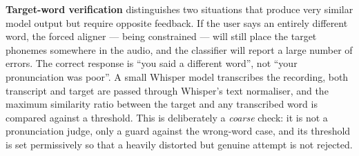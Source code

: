 \textbf{Target-word verification} distinguishes two situations that produce very
similar model output but require opposite feedback. If the user says an entirely
different word, the forced aligner --- being constrained --- will still place
the target phonemes somewhere in the audio, and the classifier will report a
large number of errors. The correct response is ``you said a different word'',
not ``your pronunciation was poor''. A small Whisper model transcribes the
recording, both transcript and target are passed through Whisper's text
normaliser, and the maximum similarity ratio between the target and any
transcribed word is compared against a threshold. This is deliberately a
\emph{coarse} check: it is not a pronunciation judge, only a guard against the
wrong-word case, and its threshold is set permissively so that a heavily
distorted but genuine attempt is not rejected.

